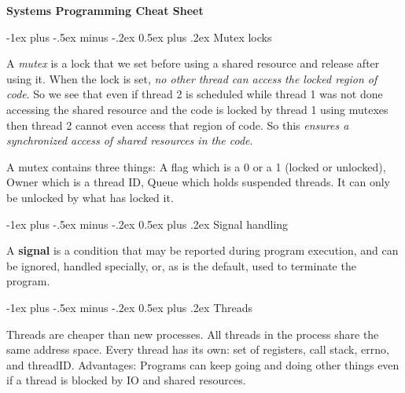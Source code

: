 \documentclass[10pt,landscape, a4paper]{article}
\makeatletter
\renewcommand{\section}{\@startsection{section}{1}{0mm}%
                                {-1ex plus -.5ex minus -.2ex}%
                                {0.5ex plus .2ex}%
                                {\normalfont\large\bfseries}}
\makeatother
\begin{document}
\renewcommand{\ttdefault}{cmtt}

\raggedright
\footnotesize
\begin{multicols}{3}

\setlength{\premulticols}{1pt}
\setlength{\postmulticols}{1pt}
\setlength{\multicolsep}{1pt}
\setlength{\columnsep}{2pt}

\begin{center}
     \Large{\textbf{Systems Programming Cheat Sheet}} \\
\end{center}

\section{Mutex locks}

A \emph{mutex} is a lock that we set before using a shared resource and release after using it. 
When the lock is set, \emph{no other thread can access the locked region of code}. 
So we see that even if thread 2 is scheduled while thread 1 was not done accessing 
the shared resource and the code is locked by thread 1 using mutexes then thread 2 
cannot even access that region of code. So this \emph{ensures a synchronized access of shared resources in the code}.



A mutex contains three things: A flag which is a 0 or a 1 (locked or unlocked), 
Owner which is a thread ID, Queue which holds suspended threads. 
It can only be unlocked by what has locked it.

\section{Signal handling}

A {\bf signal} is a condition that may be reported during program execution, 
and can be ignored, handled specially, or, as is the default, 
used to terminate the program.



\section{Threads}

Threads are cheaper than new processes.
All threads in the process share the same address space.
Every thread has its own: set of registers, call stack, errno,
and threadID. Advantages: Programs can keep going and doing other
things even if a thread is blocked by IO and shared resources.


\end{multicols}
\end{document}
